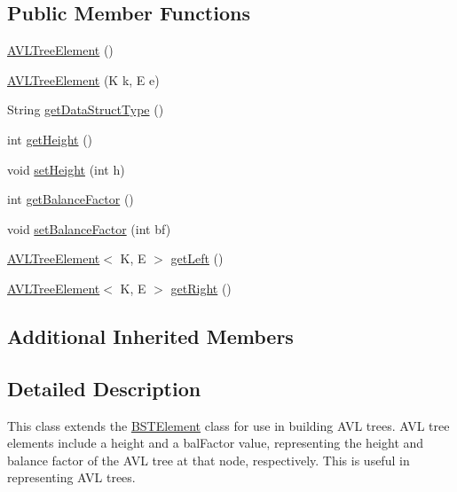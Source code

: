 \subsection*{Public Member Functions}
\begin{DoxyCompactItemize}
\item 
\hyperlink{classbridges_1_1base_1_1_a_v_l_tree_element_a8fe4490d3d5d16991736bd1a7243b904}{A\+V\+L\+Tree\+Element} ()
\item 
\hyperlink{classbridges_1_1base_1_1_a_v_l_tree_element_a060ec94b52675313ad15388e3f292df5}{A\+V\+L\+Tree\+Element} (K k, E e)
\item 
String \hyperlink{classbridges_1_1base_1_1_a_v_l_tree_element_abdd9e63de10732ef46bd5d531bd7f9d8}{get\+Data\+Struct\+Type} ()
\item 
int \hyperlink{classbridges_1_1base_1_1_a_v_l_tree_element_a52fe2886334c841547d238db69022697}{get\+Height} ()
\item 
void \hyperlink{classbridges_1_1base_1_1_a_v_l_tree_element_ac42b744989ed7e18dcbd52980e674b33}{set\+Height} (int h)
\item 
int \hyperlink{classbridges_1_1base_1_1_a_v_l_tree_element_a0478ca0351cd714e8f7b8e49703990c8}{get\+Balance\+Factor} ()
\item 
void \hyperlink{classbridges_1_1base_1_1_a_v_l_tree_element_a0dc3c83e750cc39535afb08ea92f6c98}{set\+Balance\+Factor} (int bf)
\item 
\hyperlink{classbridges_1_1base_1_1_a_v_l_tree_element}{A\+V\+L\+Tree\+Element}$<$ K, E $>$ \hyperlink{classbridges_1_1base_1_1_a_v_l_tree_element_a86f1329b19d2886ba7bf713e3844ecd6}{get\+Left} ()
\item 
\hyperlink{classbridges_1_1base_1_1_a_v_l_tree_element}{A\+V\+L\+Tree\+Element}$<$ K, E $>$ \hyperlink{classbridges_1_1base_1_1_a_v_l_tree_element_aab93418ac19605f2c7c57aa38d110921}{get\+Right} ()
\end{DoxyCompactItemize}
\subsection*{Additional Inherited Members}


\subsection{Detailed Description}
This class extends the \hyperlink{classbridges_1_1base_1_1_b_s_t_element}{B\+S\+T\+Element} class for use in building A\+VL trees. A\+VL tree elements include a \textquotesingle{}height\textquotesingle{} and a \textquotesingle{}bal\+Factor\textquotesingle{} value, representing the height and balance factor of the A\+VL tree at that node, respectively. This is useful in representing A\+VL trees. 

